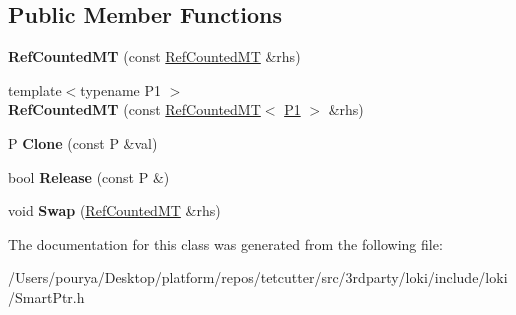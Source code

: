 \subsection*{Public Member Functions}
\begin{DoxyCompactItemize}
\item 
\hypertarget{classLoki_1_1RefCountedMTAdj_1_1RefCountedMT_a5c383df9325fa79a5d221bf802a9c32c}{}{\bfseries Ref\+Counted\+M\+T} (const \hyperlink{classLoki_1_1RefCountedMTAdj_1_1RefCountedMT}{Ref\+Counted\+M\+T} \&rhs)\label{classLoki_1_1RefCountedMTAdj_1_1RefCountedMT_a5c383df9325fa79a5d221bf802a9c32c}

\item 
\hypertarget{classLoki_1_1RefCountedMTAdj_1_1RefCountedMT_ad278ae9d2f1f8a04a8c6b7be8a03492a}{}{\footnotesize template$<$typename P1 $>$ }\\{\bfseries Ref\+Counted\+M\+T} (const \hyperlink{classLoki_1_1RefCountedMTAdj_1_1RefCountedMT}{Ref\+Counted\+M\+T}$<$ \hyperlink{structP1}{P1} $>$ \&rhs)\label{classLoki_1_1RefCountedMTAdj_1_1RefCountedMT_ad278ae9d2f1f8a04a8c6b7be8a03492a}

\item 
\hypertarget{classLoki_1_1RefCountedMTAdj_1_1RefCountedMT_a2e7623e3efec641b6e0c97bcf503f5ca}{}P {\bfseries Clone} (const P \&val)\label{classLoki_1_1RefCountedMTAdj_1_1RefCountedMT_a2e7623e3efec641b6e0c97bcf503f5ca}

\item 
\hypertarget{classLoki_1_1RefCountedMTAdj_1_1RefCountedMT_abd88ee9a5ee787f4c1018528df1ff8f1}{}bool {\bfseries Release} (const P \&)\label{classLoki_1_1RefCountedMTAdj_1_1RefCountedMT_abd88ee9a5ee787f4c1018528df1ff8f1}

\item 
\hypertarget{classLoki_1_1RefCountedMTAdj_1_1RefCountedMT_a728800d6f7fbcdd394da025b1665792f}{}void {\bfseries Swap} (\hyperlink{classLoki_1_1RefCountedMTAdj_1_1RefCountedMT}{Ref\+Counted\+M\+T} \&rhs)\label{classLoki_1_1RefCountedMTAdj_1_1RefCountedMT_a728800d6f7fbcdd394da025b1665792f}

\end{DoxyCompactItemize}


The documentation for this class was generated from the following file\+:\begin{DoxyCompactItemize}
\item 
/\+Users/pourya/\+Desktop/platform/repos/tetcutter/src/3rdparty/loki/include/loki/Smart\+Ptr.\+h\end{DoxyCompactItemize}
